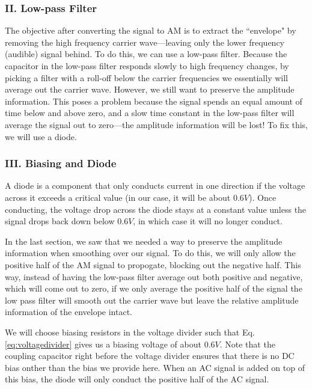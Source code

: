 \documentclass[12pt]{article}
\begin{document}
\subsubsection*{II. Low-pass Filter}
The objective after converting the signal to AM is to extract the ``envelope" by removing the high frequency carrier wave---leaving only the lower frequency (audible) signal behind. To do this, we can use a low-pass filter. Because the capacitor in the low-pass filter responds slowly to high frequency changes, by picking a filter with a roll-off below the carrier frequencies we essentially will average out the carrier wave. However, we still want to preserve the amplitude information. This poses a problem because the signal spends an equal amount of time below and above zero, and a slow time constant in the low-pass filter will average the signal out to zero---the amplitude information will be lost! To fix this, we will use a diode.

\subsubsection*{III. Biasing and Diode}
A diode is a component that only conducts current in one direction if the voltage across it exceeds a critical value (in our case, it will be about $0.6V$). Once conducting, the voltage drop across the diode stays at a constant value unless the signal drops back down below $0.6V$, in which case it will no longer conduct.

In the last section, we saw that we needed a way to preserve the amplitude information when smoothing over our signal. To do this, we will only allow the positive half of the AM signal to propogate, blocking out the negative half. This way, instead of having the low-pass filter average out both positive and negative, which will come out to zero, if we only average the positive half of the signal the low pass filter will smooth out the carrier wave but leave the relative amplitude information of the envelope intact.

We will choose biasing resistors in the voltage divider such that Eq.\ref{eq:voltagedivider} gives us a biasing voltage of about $0.6V$. Note that the coupling capacitor right before the voltage divider ensures that there is no DC bias onther than the bias we provide here. When an AC signal is added on top of this bias, the diode will only conduct the positive half of the AC signal.
\end{document}
